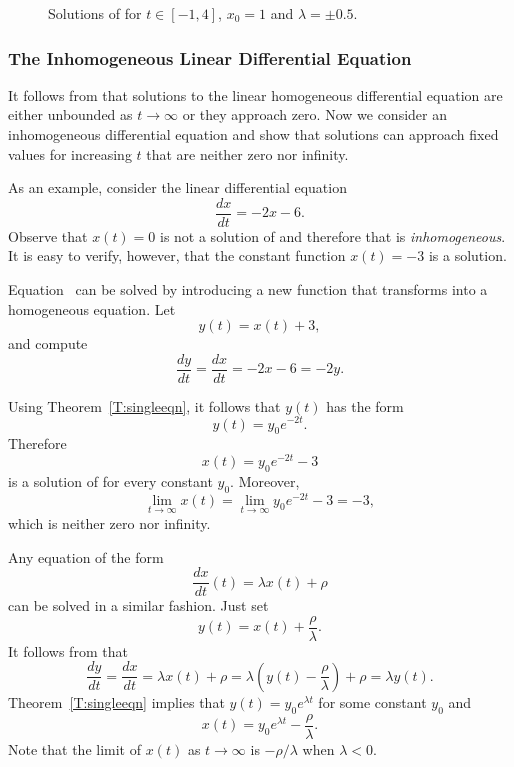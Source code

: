 \documentclass{ximera}
\begin{document}
\begin{figure}[htb]
     \centerline{%
     }
     \caption{Solutions of \protect{}
              for $t\in [-1,4]$, $x_0=1$ and $\lambda=\pm 0.5$.}
     \label{graph_labelfig}
\end{figure}


  \subsubsection*{The Inhomogeneous Linear Differential Equation}

It follows from  that solutions to the linear homogeneous
differential equation  are either unbounded as $t\to \infty$ or 
they approach zero.  Now we consider an inhomogeneous differential 
equation and show that solutions can approach fixed values for increasing 
$t$ that are neither zero nor infinity.

As an example, consider the linear differential equation
\begin{equation} \label{E:ivp2}
\frac{dx}{dt} = -2x-6.
\end{equation}
Observe that $x(t)=0$ is not a solution of  and therefore
that  is {\em inhomogeneous}.  It is easy to verify, however, 
that the constant function $x(t)=-3$ is a solution.

Equation~ can be solved by introducing a new function that 
transforms  into a homogeneous equation.  Let
\[
y(t) = x(t) + 3,
\]
and compute
\[
\frac{dy}{dt} = \frac{dx}{dt} = -2x-6 = -2y.
\]

Using Theorem~\ref{T:singleeqn}, it follows that $y(t)$ has the form
\[
y(t) = y_0e^{-2t}.
\]
Therefore
\[
x(t) =  y_0e^{-2t}-3
\]
is a solution of  for every constant $y_0$.  Moreover, 
\[
\lim_{t\to\infty} x(t) = \lim_{t\to\infty} y_0e^{-2t} -3=-3,
\]
which is neither zero nor infinity.

Any equation of the form
\begin{equation} \label{ivp2}
\frac{dx}{dt}(t)  = \lambda x(t) +\rho
\end{equation}
can be solved in a similar fashion.  Just set 
\[
y(t) = x(t) + \frac{\rho}{\lambda}.
\]
It follows from  that
\[
\frac{dy}{dt} = \frac{dx}{dt} = \lambda x(t) +\rho =
\lambda\left( y(t)-\frac{\rho}{\lambda}\right) +\rho = \lambda y(t).
\]
Theorem~\ref{T:singleeqn} implies that $y(t) = y_0e^{\lambda t}$ for some 
constant $y_0$ and
\[
x(t) = y_0e^{\lambda t} - \frac{\rho}{\lambda}.
\]
Note that the limit of $x(t)$ as $t\to\infty$ is $-\rho/\lambda$ when 
$\lambda<0$.
\end{document}
